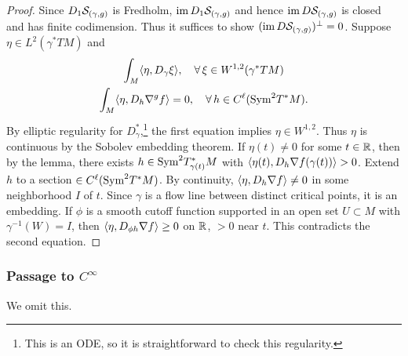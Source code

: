 \begin{proof}
	Since $D_1{\mathcal{S}}_{(\gamma, g)}$ is Fredholm, $\operatorname{im} D_1{\mathcal{S}}_{(\gamma, g)}$ 
	and hence $\operatorname{im} D{\mathcal{S}}_{(\gamma, g)}$ is closed and has finite codimension.
	Thus it suffices to show $(\operatorname{im} D{\mathcal{S}}_{(\gamma, g)})^\perp = 0$. 
	Suppose $\eta \in L^2 (\gamma^*TM)$ and 
	\begin{gather*}
		\int_M \langle \eta, D_\gamma \xi \rangle, 
			\quad \forall\, \xi \in W^{1, 2} (\gamma^*TM) \\
		\int_M \langle \eta, D_h \nabla^g f \rangle = 0,
			\quad \forall\, h \in C^\ell(\mathrm{Sym}^2 T^*M).
	\end{gather*} 
	By elliptic regularity for $D_\gamma^*$,\footnote{This is 
	an ODE, so it is straightforward to check this regularity.} 
	the first equation implies $\eta \in W^{1, 2}$. 
	Thus $\eta$ is continuous by the Sobolev embedding theorem. 
	If $\eta(t) \neq 0$ for some $t \in {\mathbb{R}}$, then by the lemma, 
	there exists $h \in \mathrm{Sym}^2 T_{\gamma(t)}^*M$ with 
	$\langle \eta(t), D_h \nabla f(\gamma(t)) \rangle > 0$. 
	Extend $h$ to a section $\in C^\ell(\mathrm{Sym}^2 T^*M)$. 
	By continuity, $\langle \eta, D_h \nabla f \rangle \neq 0$ 
	in some neighborhood $I$ of $t$. 
	Since $\gamma$ is a flow line between distinct critical points, 
	it is an embedding. 
	If $\phi$ is a smooth cutoff function supported 
	in an open set $U \subset M$ with $\gamma^{-1} (W) = I$, 
	then $\langle \eta, D_{\phi h} \nabla f \rangle \geq 0$ on ${\mathbb{R}}$, $>0$ near $t$. 
	This contradicts the second equation.
\end{proof}

\subsubsection{Passage to \texorpdfstring{$C^\infty$}{C^infty}}
We omit this.
